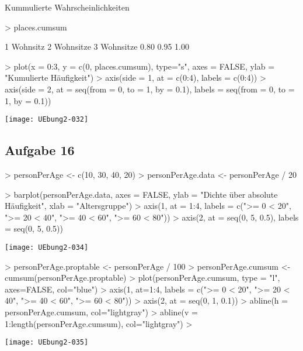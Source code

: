 \documentclass{article}
\begin{document}
Kummulierte Wahrscheinlichkeiten

\begin{Schunk}
\begin{Sinput}
> places.cumsum
\end{Sinput}
\begin{Soutput}
 1 Wohnsitz 2 Wohnsitze 3 Wohnsitze 
       0.80        0.95        1.00 
\end{Soutput}
\end{Schunk}

\begin{Schunk}
\begin{Sinput}
> plot(x = 0:3, y = c(0, places.cumsum), type="s", axes = FALSE, ylab = "Kumulierte Häufigkeit")
> axis(side = 1, at = c(0:4), labels = c(0:4))
> axis(side = 2, at = seq(from = 0, to = 1, by = 0.1), labels = seq(from = 0, to = 1, by = 0.1))
\end{Sinput}
\end{Schunk}
\texttt{[image: UEbung2-032]}

\subsection{Aufgabe 16}

\begin{Schunk}
\begin{Sinput}
> personPerAge <- c(10, 30, 40, 20)
> personPerAge.data <- personPerAge / 20
\end{Sinput}
\end{Schunk}
\begin{Schunk}
\begin{Sinput}
> barplot(personPerAge.data, axes = FALSE, ylab = "Dichte über absolute Häufigkeit", xlab = "Altersgruppe")
> axis(1, at = 1:4, labels = c(">= 0 < 20", ">= 20 < 40", ">= 40 < 60", ">= 60 < 80"))
> axis(2, at = seq(0, 5, 0.5), labels = seq(0, 5, 0.5))
\end{Sinput}
\end{Schunk}
\texttt{[image: UEbung2-034]}
\begin{Schunk}
\begin{Sinput}
> personPerAge.proptable <- personPerAge / 100
> personPerAge.cumsum <- cumsum(personPerAge.proptable)
> plot(personPerAge.cumsum, type = "l", axes=FALSE, col="blue")
> axis(1, at=1:4, labels = c(">= 0 < 20", ">= 20 < 40", ">= 40 < 60", ">= 60 < 80"))
> axis(2, at = seq(0, 1, 0.1))
> abline(h = personPerAge.cumsum, col="lightgray")
> abline(v = 1:length(personPerAge.cumsum), col="lightgray")
> 
\end{Sinput}
\end{Schunk}
\texttt{[image: UEbung2-035]}
\end{document}
